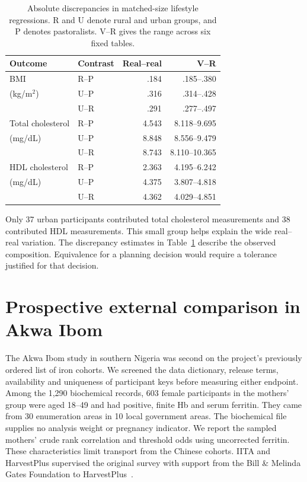 \begin{table}[t]
\caption{Absolute discrepancies in matched-size lifestyle regressions. R and U denote rural and urban groups, and P denotes pastoralists. V--R gives the range across six fixed tables.}
\label{tab:lifestyle}
\centering
\begin{tabular}{@{}llrr@{}}
\toprule
Outcome & Contrast & Real--real & V--R\\
\midrule
BMI & R--P & .184 & .185--.380\\
(kg/m$^2$) & U--P & .316 & .314--.428\\
 & U--R & .291 & .277--.497\\
\midrule
Total cholesterol & R--P & 4.543 & 8.118--9.695\\
(mg/dL) & U--P & 8.848 & 8.556--9.479\\
 & U--R & 8.743 & 8.110--10.365\\
\midrule
HDL cholesterol & R--P & 2.363 & 4.195--6.242\\
(mg/dL) & U--P & 4.375 & 3.807--4.818\\
 & U--R & 4.362 & 4.029--4.851\\
\bottomrule
\end{tabular}
\end{table}

Only 37 urban participants contributed total cholesterol measurements and 38 contributed HDL measurements. This small group helps explain the wide real--real variation. The discrepancy estimates in Table~\ref{tab:lifestyle} describe the observed composition. Equivalence for a planning decision would require a tolerance justified for that decision.

\section{Prospective external comparison in Akwa Ibom}
\label{app:akwa}
The Akwa Ibom study in southern Nigeria was second on the project's previously ordered list of iron cohorts. We screened the data dictionary, release terms, availability and uniqueness of participant keys before measuring either endpoint. Among the 1,290 biochemical records, 603 female participants in the mothers' group were aged 18--49 and had positive, finite Hb and serum ferritin. They came from 30 enumeration areas in 10 local government areas. The biochemical file supplies no analysis weight or pregnancy indicator. We report the sampled mothers' crude rank correlation and threshold odds using uncorrected ferritin. These characteristics limit transport from the Chinese cohorts. IITA and HarvestPlus supervised the original survey with support from the Bill \& Melinda Gates Foundation to HarvestPlus~\cite{akwa_iron}.

